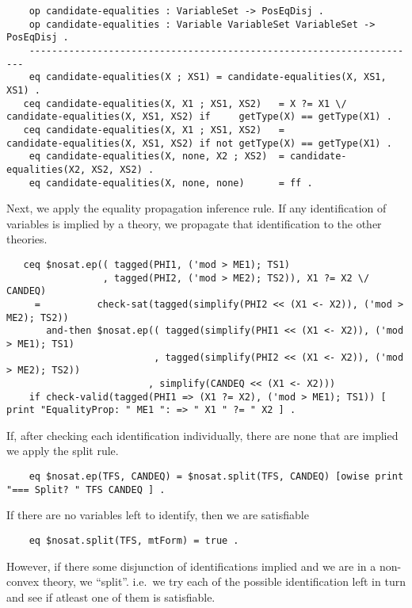 \documentclass[]{article}
\begin{document}
\begin{verbatim}
    op candidate-equalities : VariableSet -> PosEqDisj .
    op candidate-equalities : Variable VariableSet VariableSet -> PosEqDisj .
    ---------------------------------------------------------------------
    eq candidate-equalities(X ; XS1) = candidate-equalities(X, XS1, XS1) .
   ceq candidate-equalities(X, X1 ; XS1, XS2)   = X ?= X1 \/ candidate-equalities(X, XS1, XS2) if     getType(X) == getType(X1) .
   ceq candidate-equalities(X, X1 ; XS1, XS2)   =            candidate-equalities(X, XS1, XS2) if not getType(X) == getType(X1) .
    eq candidate-equalities(X, none, X2 ; XS2)  = candidate-equalities(X2, XS2, XS2) .
    eq candidate-equalities(X, none, none)      = ff .
\end{verbatim}

Next, we apply the equality propagation inference rule. If any
identification of variables is implied by a theory, we propagate that
identification to the other theories.

\begin{verbatim}
   ceq $nosat.ep(( tagged(PHI1, ('mod > ME1); TS1)
                 , tagged(PHI2, ('mod > ME2); TS2)), X1 ?= X2 \/ CANDEQ)
     =          check-sat(tagged(simplify(PHI2 << (X1 <- X2)), ('mod > ME2); TS2))
       and-then $nosat.ep(( tagged(simplify(PHI1 << (X1 <- X2)), ('mod > ME1); TS1)
                          , tagged(simplify(PHI2 << (X1 <- X2)), ('mod > ME2); TS2))
                         , simplify(CANDEQ << (X1 <- X2)))
    if check-valid(tagged(PHI1 => (X1 ?= X2), ('mod > ME1); TS1)) [ print "EqualityProp: " ME1 ": => " X1 " ?= " X2 ] .
\end{verbatim}

If, after checking each identification individually, there are none that
are implied we apply the split rule.

\begin{verbatim}
    eq $nosat.ep(TFS, CANDEQ) = $nosat.split(TFS, CANDEQ) [owise print "=== Split? " TFS CANDEQ ] .
\end{verbatim}

If there are no variables left to identify, then we are satisfiable

\begin{verbatim}
    eq $nosat.split(TFS, mtForm) = true .
\end{verbatim}

However, if there some disjunction of identifications implied and we are
in a non-convex theory, we ``split''. i.e.~we try each of the possible
identification left in turn and see if atleast one of them is
satisfiable.
\end{document}

